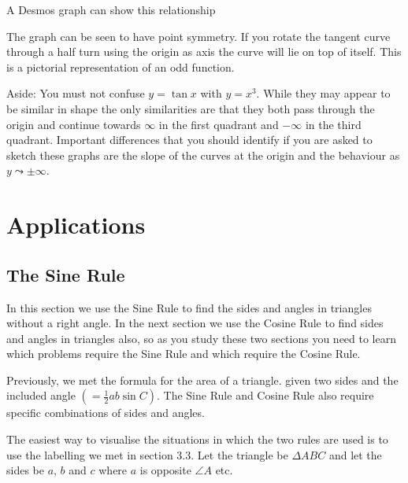 A Desmos graph can show this relationship 

\setlength\fboxrule{0.01in}\setlength\fboxsep{0.2in}

The graph can be seen to have point symmetry. If you rotate the tangent curve through a half turn using the origin as axis the curve will lie on top of itself. This is a pictorial representation of an odd function.

Aside: You must not confuse $y =\tan  x$ with $y =x^{3}$. While they may appear to be similar in shape the only similarities are that they both pass through the origin and continue towards $\infty $ in the first quadrant and $ -\infty $ in the third quadrant. Important differences that you should identify if you are asked to sketch these graphs are the slope of the curves at the origin and the behaviour as $y \leadsto  \pm \infty $. 

\section{Applications}
\subsection{The Sine Rule}
In this section we use the Sine Rule to find the sides and angles in triangles without a right angle. In the next section we use the Cosine Rule to find sides and angles in triangles also, so as you study these two sections you need to learn which problems require the Sine Rule and which require the Cosine Rule. 

Previously, we met the formula for the area of a triangle. given two sides and the included angle $\left ( =\frac{1}{2} a b \sin  C\right )$. The Sine Rule and Cosine Rule also require specific combinations of sides and angles. 

The easiest way to visualise the situations in which the two rules are used is to use the labelling we met in section $3.3$. Let the triangle be $ \Delta A B C$ and let the sides be $a$, $b$ and $c$ where $a$ is opposite $\angle A$ etc. 

\setlength\fboxrule{0in}\setlength\fboxsep{0.2in}

